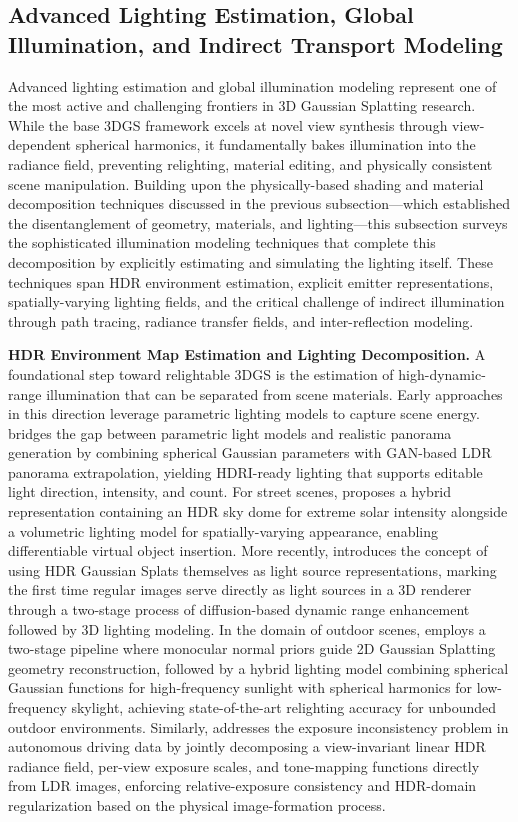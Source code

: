 \documentclass[11pt]{article}
\begin{document}
\subsection{Advanced Lighting Estimation, Global Illumination, and Indirect Transport Modeling}

Advanced lighting estimation and global illumination modeling represent one of the most active and challenging frontiers in 3D Gaussian Splatting research. While the base 3DGS framework excels at novel view synthesis through view-dependent spherical harmonics, it fundamentally bakes illumination into the radiance field, preventing relighting, material editing, and physically consistent scene manipulation. Building upon the physically-based shading and material decomposition techniques discussed in the previous subsection---which established the disentanglement of geometry, materials, and lighting---this subsection surveys the sophisticated illumination modeling techniques that complete this decomposition by explicitly estimating and simulating the lighting itself. These techniques span HDR environment estimation, explicit emitter representations, spatially-varying lighting fields, and the critical challenge of indirect illumination through path tracing, radiance transfer fields, and inter-reflection modeling.

\textbf{HDR Environment Map Estimation and Lighting Decomposition.} A foundational step toward relightable 3DGS is the estimation of high-dynamic-range illumination that can be separated from scene materials. Early approaches in this direction leverage parametric lighting models to capture scene energy. \cite{ref580} bridges the gap between parametric light models and realistic panorama generation by combining spherical Gaussian parameters with GAN-based LDR panorama extrapolation, yielding HDRI-ready lighting that supports editable light direction, intensity, and count. For street scenes, \cite{ref581} proposes a hybrid representation containing an HDR sky dome for extreme solar intensity alongside a volumetric lighting model for spatially-varying appearance, enabling differentiable virtual object insertion. More recently, \cite{ref582} introduces the concept of using HDR Gaussian Splats themselves as light source representations, marking the first time regular images serve directly as light sources in a 3D renderer through a two-stage process of diffusion-based dynamic range enhancement followed by 3D lighting modeling. In the domain of outdoor scenes, \cite{ref583} employs a two-stage pipeline where monocular normal priors guide 2D Gaussian Splatting geometry reconstruction, followed by a hybrid lighting model combining spherical Gaussian functions for high-frequency sunlight with spherical harmonics for low-frequency skylight, achieving state-of-the-art relighting accuracy for unbounded outdoor environments. Similarly, \cite{ref298} addresses the exposure inconsistency problem in autonomous driving data by jointly decomposing a view-invariant linear HDR radiance field, per-view exposure scales, and tone-mapping functions directly from LDR images, enforcing relative-exposure consistency and HDR-domain regularization based on the physical image-formation process.
\end{document}
